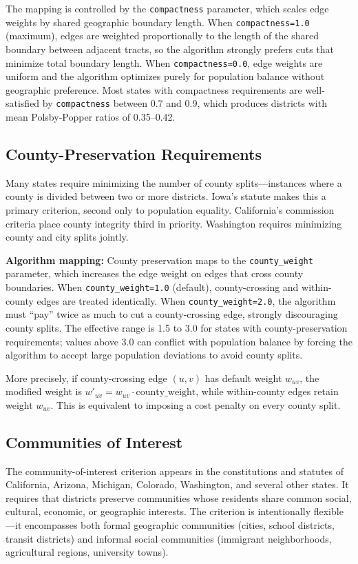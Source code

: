 The mapping is controlled by the \texttt{compactness} parameter, which scales edge weights by shared geographic boundary length. When \texttt{compactness=1.0} (maximum), edges are weighted proportionally to the length of the shared boundary between adjacent tracts, so the algorithm strongly prefers cuts that minimize total boundary length. When \texttt{compactness=0.0}, edge weights are uniform and the algorithm optimizes purely for population balance without geographic preference. Most states with compactness requirements are well-satisfied by \texttt{compactness} between 0.7 and 0.9, which produces districts with mean Polsby-Popper ratios of 0.35--0.42.

\subsection{County-Preservation Requirements}

Many states require minimizing the number of county splits---instances where a county is divided between two or more districts. Iowa's statute makes this a primary criterion, second only to population equality. California's commission criteria place county integrity third in priority. Washington requires minimizing county and city splits jointly.

\textbf{Algorithm mapping:} County preservation maps to the \texttt{county\_weight} parameter, which increases the edge weight on edges that cross county boundaries. When \texttt{county\_weight=1.0} (default), county-crossing and within-county edges are treated identically. When \texttt{county\_weight=2.0}, the algorithm must ``pay'' twice as much to cut a county-crossing edge, strongly discouraging county splits. The effective range is 1.5 to 3.0 for states with county-preservation requirements; values above 3.0 can conflict with population balance by forcing the algorithm to accept large population deviations to avoid county splits.

More precisely, if county-crossing edge $(u,v)$ has default weight $w_{uv}$, the modified weight is $w'_{uv} = w_{uv} \cdot \text{county\_weight}$, while within-county edges retain weight $w_{uv}$. This is equivalent to imposing a cost penalty on every county split.

\subsection{Communities of Interest}

The community-of-interest criterion appears in the constitutions and statutes of California, Arizona, Michigan, Colorado, Washington, and several other states. It requires that districts preserve communities whose residents share common social, cultural, economic, or geographic interests. The criterion is intentionally flexible---it encompasses both formal geographic communities (cities, school districts, transit districts) and informal social communities (immigrant neighborhoods, agricultural regions, university towns).

